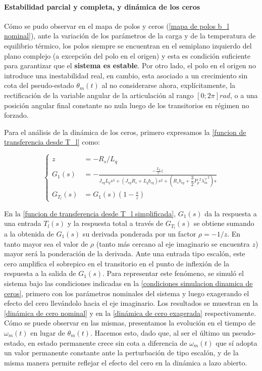 \documentclass[a4paper, 10pt, onecolumn,journal]{ieeeconf}
\begin{document}
\paragraph{\textbf{Estabilidad parcial y completa, y dinámica de los ceros}}
Cómo se pudo observar en el mapa de polos y ceros (\cref{mapa de polos b_l nominal}),  ante la variación de los parámetros de la carga
y de la temperatura de equilibrio térmico, los polos siempre se encuentran
en el semiplano izquierdo del plano complejo (a excepción del polo en el origen) y esta es condición suficiente para
garantizar que el \textbf{sistema es estable}. Por otro lado, el polo en el origen no introduce una inestabilidad real, 
en cambio, esta asociado a un crecimiento sin cota del pseudo-estado $\theta_m(t)$ al no considerarse ahora, explícitamente,
la rectificación de la variable angular de la articulación al rango  $[0;2\pi] rad$, o a una posición angular final constante no nula
luego de los transitorios en régimen no forzado.

Para el análisis de la dinámica de los ceros, primero %
expresamos la \cref{funcion de transferencia desde T_l}
como:

\begin{equation}
    \begin{cases}
        z &= -R_s/L_q\\
        G_1(s) &= -\frac{-\frac{L_q}{r}z}{J_{eq} L_{q} s^3 +\left( J_{eq} R_{s} + L_{q} b_{eq} \right)s^2 + \left( R_{s} b_{eq} + \dfrac{3}{2} {P_{p}}^2 { \lambda^{'r}_m}^2\right) s}\\
	    G_{T_l}(s) &= G_1(s)\left( 1 - \frac{s}{z}\right)
    \end{cases}
	\label{funcion de transferencia desde T_l simplificada}
\end{equation}

En la \cref{funcion de transferencia desde T_l simplificada}, $G_1(s)$ da la respuesta a una entrada $T_l(s)$
y la respuesta total a través de $G_{T_l}(s)$ se obtiene sumando a la obtenida de $G_1(s)$ su derivada
ponderada por un factor $\rho = -1/z$. En tanto mayor sea el valor de $\rho$ (tanto más cercano al eje imaginario se encuentra $z$)
mayor será la ponderación de la derivada. Ante una entrada tipo escalón,
este cero amplifica el sobrepico en el transitorio en el punto de inflexión de la respuesta a la salida de 
$G_1(s)$. Para representar este fenómeno, se simuló el sistema bajo las condiciones indicadas en la \cref{condiciones simulacion dinamica de ceros},
primero con los parámetros nominales del sistema y luego exagerando
el efecto del cero llevándolo hacia el eje imaginario. Los resultados se muestran en la \cref{dinámica de cero nominal} y en la \cref{dinámica de cero exagerada} respectivamente.
Cómo se puede observar en las mismas, presentamos la evolución en el tiempo de $\omega_m(t)$ en lugar de $\theta_m(t)$.
Hacemos esto, dado que, al ser el último un pseudo-estado, en estado permanente crece sin cota a diferencia de $\omega_m(t)$ que sí adopta un valor permanente constante ante la perturbación de tipo escalón, y de la misma
manera permite reflejar el efecto del cero en la dinámica a lazo abierto.
\end{document}
